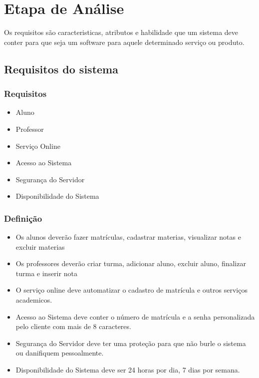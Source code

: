 

\chapter{Etapa de An\'{a}lise}
Os requisitos são caracteristicas, atributos e habilidade que um sistema deve conter para que seja um software
para aquele determinado serviço ou produto.
 \section{Requisitos do sistema}
 \subsection{Requisitos}
  \begin{itemize}
      \item Aluno
      \item Professor
      \item Serviço Online
      \item Acesso ao Sistema
      \item Segurança do Servidor
      \item Disponibilidade do Sistema
  \end{itemize}
  
  \subsection{Definição}
  \begin{itemize}
      \item Os alunos deverão fazer matrículas, cadastrar materias, visualizar notas e excluir materias
      \item Os professores deverão criar turma, adicionar aluno, excluir aluno, finalizar turma e inserir nota
      \item O serviço online deve automatizar o cadastro de matrícula e outros serviços academicos.
      \item Acesso ao Sistema deve conter o número de matrícula e a senha personalizada pelo cliente com mais de 8 caracteres.	
      \item Segurança do Servidor deve ter uma proteção para que não burle o sistema ou danifiquem pessoalmente. 
      \item Disponibilidade do Sistema  deve ser 24 horas por dia, 7 dias por semana.
  \end{itemize}
   
